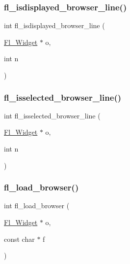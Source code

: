 \subsubsection{\texorpdfstring{fl\+\_\+isdisplayed\+\_\+browser\+\_\+line()}{fl\_isdisplayed\_browser\_line()}}
{\footnotesize\ttfamily int fl\+\_\+isdisplayed\+\_\+browser\+\_\+line (\begin{DoxyParamCaption}\item[{\hyperlink{class_fl___widget}{Fl\+\_\+\+Widget} $\ast$}]{o,  }\item[{int}]{n }\end{DoxyParamCaption})\hspace{0.3cm}{\ttfamily [inline]}}

\mbox{\label{forms_8_h_a8468738bd3b5825e8da3157bd354bed1}} 
\subsubsection{\texorpdfstring{fl\+\_\+isselected\+\_\+browser\+\_\+line()}{fl\_isselected\_browser\_line()}}
{\footnotesize\ttfamily int fl\+\_\+isselected\+\_\+browser\+\_\+line (\begin{DoxyParamCaption}\item[{\hyperlink{class_fl___widget}{Fl\+\_\+\+Widget} $\ast$}]{o,  }\item[{int}]{n }\end{DoxyParamCaption})\hspace{0.3cm}{\ttfamily [inline]}}

\mbox{\label{forms_8_h_a6923a3c99fa745654d7ff5f7fd18a2ed}} 
\subsubsection{\texorpdfstring{fl\+\_\+load\+\_\+browser()}{fl\_load\_browser()}}
{\footnotesize\ttfamily int fl\+\_\+load\+\_\+browser (\begin{DoxyParamCaption}\item[{\hyperlink{class_fl___widget}{Fl\+\_\+\+Widget} $\ast$}]{o,  }\item[{const char $\ast$}]{f }\end{DoxyParamCaption})\hspace{0.3cm}{\ttfamily [inline]}}

